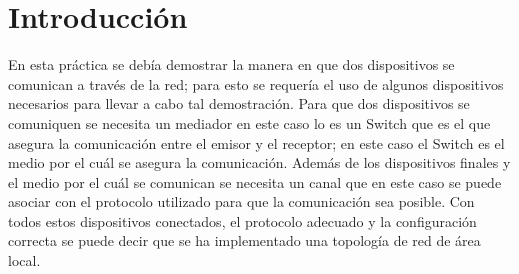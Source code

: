 \section*{Introducci\'on}

{
    En esta pr\'actica se deb\'ia demostrar la manera en que dos dispositivos se comunican a 
    trav\'es de la red; para esto se requer\'ia el uso de algunos dispositivos necesarios para 
    llevar a cabo tal demostraci\'on. Para que dos dispositivos se comuniquen se necesita un mediador
    en este caso lo es un Switch que es el que asegura la comunicaci\'on entre el emisor y el receptor;
    en este caso el Switch es el medio por el cu\'al se asegura la comunicaci\'on.\newline
    \newline
    Adem\'as de los dispositivos finales y el medio por el cu\'al se comunican se necesita un canal que 
    en este caso se puede asociar con el protocolo utilizado para que la comunicaci\'on sea posible. 
    Con todos estos dispositivos conectados, el protocolo adecuado y la configuraci\'on correcta se puede 
    decir que se ha implementado una topolog\'ia de red de \'area local. 
}